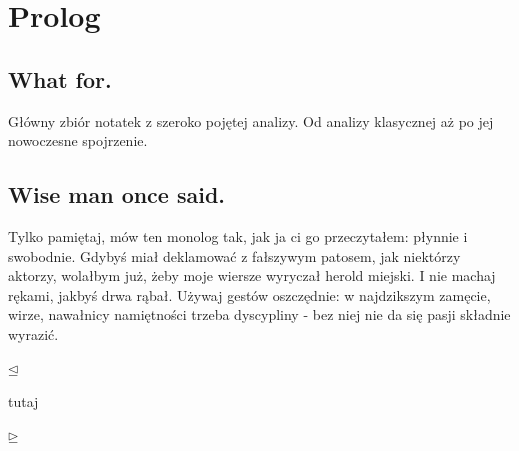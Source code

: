 \chapter{Prolog}
\section{What for.}
Główny zbiór notatek z szeroko pojętej analizy. Od analizy klasycznej aż po jej nowoczesne spojrzenie.
\section{Wise man once said.}
Tylko pamiętaj, mów ten monolog tak, jak ja ci go przeczytałem: płynnie i swobodnie. Gdybyś miał deklamować z fałszywym patosem, jak niektórzy aktorzy, wolałbym już, żeby moje wiersze wyryczał herold miejski. I nie machaj rękami, jakbyś drwa rąbał. Używaj gestów oszczędnie: w najdzikszym zamęcie, wirze, nawałnicy namiętności trzeba dyscypliny - bez niej nie da się pasji składnie wyrazić.

$\unlhd $

tutaj



$\unrhd $
